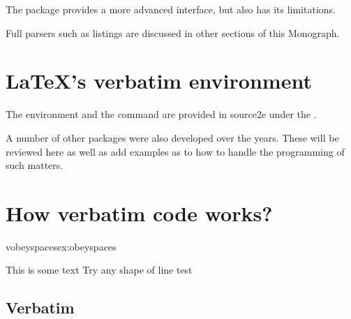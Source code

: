 The package  provides a more advanced interface, but also has its limitations.

Full parsers such as listings are discussed in other sections of this Monograph.




\section{LaTeX's verbatim environment}



The environment and the command are provided in source2e under the .

A number of other packages were also developed over the years. These will be reviewed here as well as add examples as to how to handle the programming of such matters.

\section{How verbatim code works?}

\begin{texexample}{vobeyspaces}{ex:obeyspaces}
\makeatletter
\begingroup
\obeylines
\@xobeysp

\ttfamily
         This is some text
           Try any shape of line       test

           
\endgroup


\makeatother
\end{texexample}
\subsection{Verbatim}


